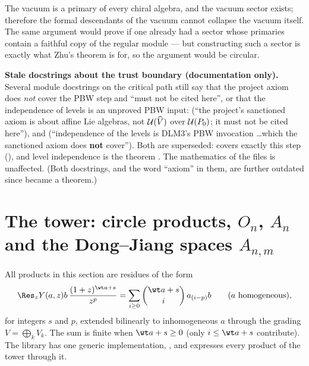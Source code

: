 \begin{physics}
The vacuum is a primary of every chiral algebra, and the vacuum sector exists; therefore the formal descendants of the vacuum
cannot collapse the vacuum itself. The same argument would prove  if one already had a sector whose primaries
contain a faithful copy of the regular module --- but constructing such a sector is exactly what Zhu's theorem is for, so
the argument would be circular.
\end{physics}

\begin{warning}
\textbf{Stale docstrings about the trust boundary (documentation only).} Several module docstrings on the critical path still say that the
project axiom does \emph{not} cover the PBW step and ``must not be cited here'', or that the independence of levels is an
unproved PBW input:  (``the project's sanctioned  axiom is about affine
Lie algebras, not $\mathcal{U}(\widehat{V})$ over $\mathcal{U}(P_0)$; it must not be cited here''), and
 (``independence of the levels is DLM3's PBW invocation \ldots which the sanctioned
 axiom does \textbf{not} cover''). Both are superseded:  covers exactly this step
(), and level independence is the theorem . The mathematics of the
files is unaffected. (Both docstrings, and the word ``axiom'' in them, are further outdated since  became a
theorem.)
\end{warning}

\section{The tower: circle products, \texorpdfstring{$O_n$}{O\_n}, \texorpdfstring{$A_n$}{A\_n} and the Dong--Jiang spaces \texorpdfstring{$A_{n,m}$}{A\_\{n,m\}}}\label{l13:sec:tower}

All products in this section are residues of the form
\begin{equation}\label{l13:eq:res}
 \Res_z Y(a,z)b\,\frac{(1+z)^{\wt a+s}}{z^{p}} = \sum_{i\ge0}\binom{\wt a+s}{i}\,a_{(i-p)}b\qquad(a\text{ homogeneous}),
\end{equation}
for integers $s$ and $p$, extended bilinearly to inhomogeneous $a$ through the grading $V = \bigoplus_kV_k$. The sum is finite
when $\wt a+s\ge0$ (only $i\le\wt a+s$ contribute). The library has one generic implementation, , and
expresses every product of the tower through it.

